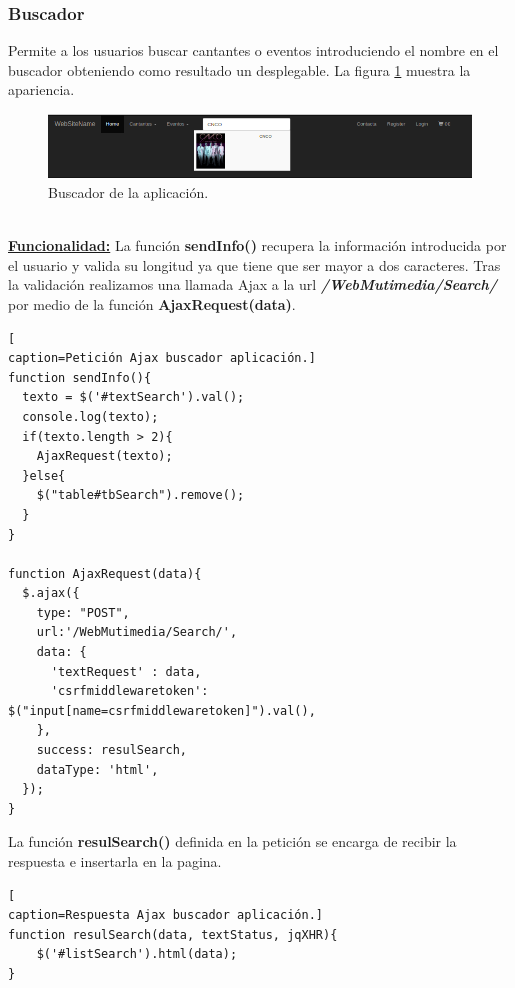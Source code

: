 \subsubsection*{Buscador}
Permite a los usuarios buscar cantantes o eventos introduciendo el nombre en el buscador obteniendo como resultado un desplegable. La figura \ref{fig:Search_Bar} muestra la apariencia.
\begin{figure}[!h]
\begin{center}
   \includegraphics[width=0.7\linewidth]{Figures/Bar_Navegacion}
  \decoRule
  \caption[Buscador de la aplicación]{Buscador de la aplicación.}
\label{fig:Search_Bar}
\end{center}
\end{figure}
\\\underline{\textbf{Funcionalidad:}} La función \textbf{sendInfo()} recupera la información introducida por el usuario y valida su longitud ya que tiene que ser mayor a dos caracteres. Tras la validación realizamos una llamada Ajax a la url \textit{\textbf{/WebMutimedia/Search/}} por medio de la función \textbf{AjaxRequest(data)}.
\begin{lstlisting}[
caption=Petición Ajax buscador aplicación.]
function sendInfo(){
  texto = $('#textSearch').val();
  console.log(texto);
  if(texto.length > 2){
    AjaxRequest(texto);
  }else{
    $("table#tbSearch").remove();
  }
}

function AjaxRequest(data){
  $.ajax({ 
    type: "POST",
    url:'/WebMutimedia/Search/',
    data: {
      'textRequest' : data,
      'csrfmiddlewaretoken': $("input[name=csrfmiddlewaretoken]").val(),
    },
    success: resulSearch,
    dataType: 'html',
  });
}
\end{lstlisting}
La función \textbf{resulSearch()} definida en la petición se encarga de recibir la respuesta e insertarla en la pagina.
\begin{lstlisting}[
caption=Respuesta Ajax buscador aplicación.]
function resulSearch(data, textStatus, jqXHR){
    $('#listSearch').html(data);
}
\end{lstlisting}
